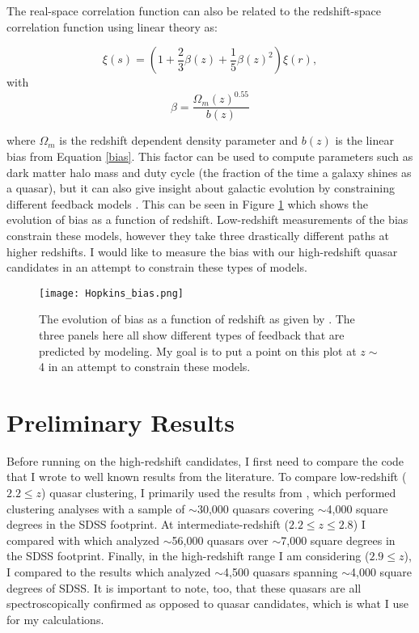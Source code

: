 \documentclass[onecolumn]{emulateapj}
\begin{document}
The real-space correlation function can also be related to the redshift-space correlation function using linear theory \citep{Kaiser1987} as:

\begin{equation}\label{lin_th}
\xi(s) = \left(1+\frac{2}{3}\beta(z)+\frac{1}{5}\beta(z)^2\right)\xi(r),
\end{equation}
with
\begin{equation}\label{Beta}
\beta = \frac{\Omega_m(z)^{0.55}}{b(z)}
\end{equation}

where $\Omega_m$ is the redshift dependent density parameter and $b(z)$ is the linear bias from Equation \ref{bias}. This factor can be used to compute parameters such as dark matter halo mass and duty cycle (the fraction of the time a galaxy shines as a quasar), but it can also give insight about galactic evolution by constraining different feedback models \citep{Hopkins2007a}. This can be seen in Figure \ref{hopkinsbias} \citep{Hopkins2007a} which shows the evolution of bias as a function of redshift. Low-redshift measurements of the bias constrain these models, however they take three drastically different paths at higher redshifts. I would like to measure the bias with our high-redshift quasar candidates in an attempt to constrain these types of models.


\begin{figure}[!h]
	\centering
	\texttt{[image: Hopkins\_bias.png]}
	\caption{\footnotesize{The evolution of bias as a function of redshift as given by \citet{Hopkins2007a}. The three panels here all show different types of feedback that are predicted by modeling. My goal is to put a point on this plot at $z \sim$ 4 in an attempt to constrain these models.}}
	\label{hopkinsbias}
\end{figure}




\clearpage

\section{Preliminary Results}\label{first_results}
Before running on the high-redshift candidates, I first need to compare the code that I wrote to well known results from the literature. To compare low-redshift ($2.2\le z$) quasar clustering, I primarily used the results from \citet{Ross2009}, which performed clustering analyses with a sample of $\sim$30,000 quasars covering $\sim$4,000 square degrees in the SDSS footprint. At intermediate-redshift ($2.2\le z \le 2.8$) I compared with \citet{Eftekharzadeh2015} which analyzed $\sim$56,000 quasars over $\sim$7,000 square degrees in the SDSS footprint. Finally, in the high-redshift range I am considering ($2.9 \le z$), I compared to the \citet{Shen2007} results which analyzed $\sim$4,500 quasars spanning $\sim$4,000 square degrees of SDSS. It is important to note, too, that these quasars are all spectroscopically confirmed as opposed to quasar candidates, which is what I use for my calculations.
\end{document}

